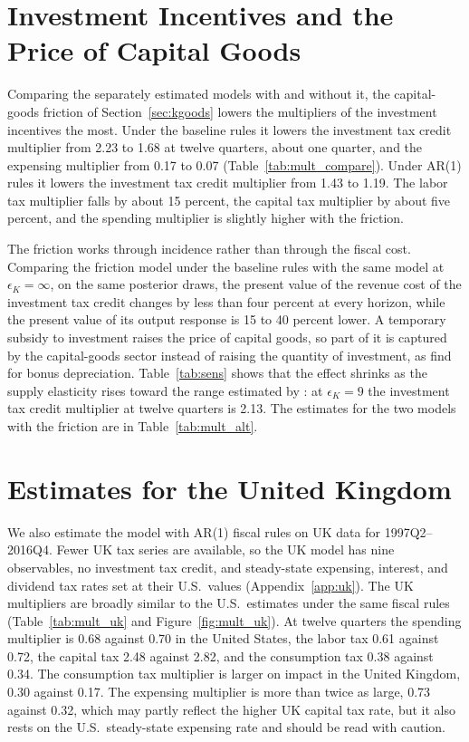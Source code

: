\documentclass[article,11pt,letterpaper,fleqn]{article}
\theoremstyle{definition}
\numberwithin{equation}{section}
\begin{document}
\section{Investment Incentives and the Price of Capital Goods}
\label{sec:kgoods_results}

Comparing the separately estimated models with and without it, the capital-goods friction of Section~\ref{sec:kgoods} lowers the multipliers of the investment incentives the most. Under the baseline rules it lowers the investment tax credit multiplier from 2.23 to 1.68 at twelve quarters, about one quarter, and the expensing multiplier from 0.17 to 0.07 (Table~\ref{tab:mult_compare}). Under AR(1) rules it lowers the investment tax credit multiplier from 1.43 to 1.19. The labor tax multiplier falls by about 15 percent, the capital tax multiplier by about five percent, and the spending multiplier is slightly higher with the friction.

The friction works through incidence rather than through the fiscal cost. Comparing the friction model under the baseline rules with the same model at $\epsilon_K = \infty$, on the same posterior draws, the present value of the revenue cost of the investment tax credit changes by less than four percent at every horizon, while the present value of its output response is 15 to 40 percent lower. A temporary subsidy to investment raises the price of capital goods, so part of it is captured by the capital-goods sector instead of raising the quantity of investment, as \citet{House_Shapiro_2008} find for bonus depreciation. Table~\ref{tab:sens} shows that the effect shrinks as the supply elasticity rises toward the range estimated by \citet{House_Shapiro_2008}: at $\epsilon_K = 9$ the investment tax credit multiplier at twelve quarters is 2.13. The estimates for the two models with the friction are in Table~\ref{tab:mult_alt}.

\section{Estimates for the United Kingdom}
\label{sec:uk}

We also estimate the model with AR(1) fiscal rules on UK data for 1997Q2--2016Q4. Fewer UK tax series are available, so the UK model has nine observables, no investment tax credit, and steady-state expensing, interest, and dividend tax rates set at their U.S.\ values (Appendix~\ref{app:uk}). The UK multipliers are broadly similar to the U.S.\ estimates under the same fiscal rules (Table~\ref{tab:mult_uk} and Figure~\ref{fig:mult_uk}). At twelve quarters the spending multiplier is 0.68 against 0.70 in the United States, the labor tax 0.61 against 0.72, the capital tax 2.48 against 2.82, and the consumption tax 0.38 against 0.34. The consumption tax multiplier is larger on impact in the United Kingdom, 0.30 against 0.17. The expensing multiplier is more than twice as large, 0.73 against 0.32, which may partly reflect the higher UK capital tax rate, but it also rests on the U.S.\ steady-state expensing rate and should be read with caution.
\end{document}
